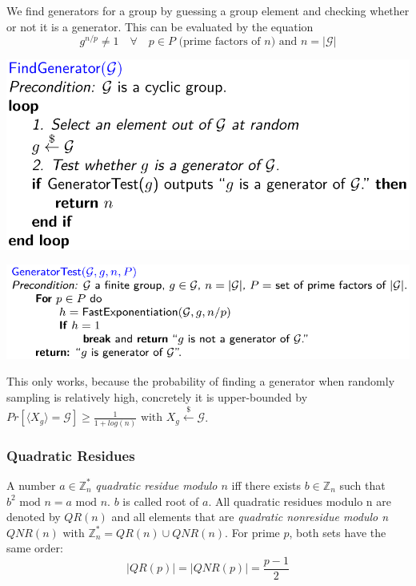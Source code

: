 We find generators for a group by guessing a group element and checking
whether or not it is a generator. This can be evaluated by the equation
\[g^{n/p} \neq 1 \quad \forall \quad p \in P \text{ (prime factors of $n$) and } n = |\mathcal{G}|\]

\begin{minipage}{.35\linewidth}
\includegraphics[width=\linewidth]{img/gen_find}
\end{minipage}\hfill
\begin{minipage}{.6\linewidth}
\includegraphics[width=\linewidth]{img/gen_test}
\end{minipage}

This only works, because the probability of finding a generator when
randomly sampling is relatively high, concretely it is upper-bounded by
\(Pr[\langle X_g \rangle = \mathcal{G}] \geq \frac{1}{1+log(n)} \text{ with } X_g \overset{\$}{\leftarrow}\mathcal{G}\).

\hypertarget{quadratic-residues}{%
\subsubsection{Quadratic Residues}\label{quadratic-residues}}

A number \(a \in \mathbb{Z}_n^*\) \emph{quadratic residue modulo \(n\)}
iff there exists \(b \in \mathbb{Z}_n\) such that
\(b^2 \text{ mod } n = a \text{ mod } n\). \(b\) is called root of
\(a\). All quadratic residues modulo n are denoted by \(QR(n)\) and all
elements that are \emph{quadratic nonresidue modulo n} \(QNR(n)\) with
\(\mathbb{Z}_n^* = QR(n) \cup QNR(n)\). For prime \(p\), both sets have
the same order: \[|QR(p)| = |QNR(p)| = \frac{p-1}{2}\]

